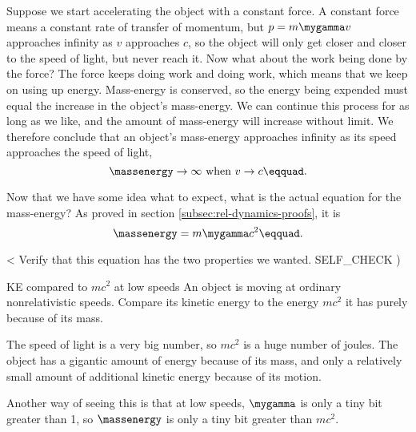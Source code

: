 Suppose we start accelerating the object with a constant force. A constant force means a constant
rate of transfer of momentum, but $p=m\mygamma v$ approaches infinity as $v$ approaches $c$, so the object
will only get closer and closer to the speed of light, but never reach it. Now what about the work being
done by the force? The force keeps doing work and doing work, which means that we keep on using up
energy. Mass-energy is conserved, so the energy being expended must equal the increase in the object's
mass-energy. We can continue this process for as long as we like, and the amount of mass-energy
will increase without limit. We therefore conclude that an object's mass-energy approaches infinity
as its speed approaches the speed of light,
\begin{equation*}
  \massenergy \rightarrow \infty\ \text{when}\ v \rightarrow c\eqquad.
\end{equation*}

Now that we have some idea what to expect, what is the actual equation for the mass-energy? 
As proved in section \ref{subsec:rel-dynamics-proofs}, it is
\begin{equation*}
  \massenergy =m\mygamma c^2\eqquad.
\end{equation*}

<%
Verify that this equation has the two properties we wanted.
  SELF_CHECK
  ) %

\begin{eg}{KE compared to $mc^2$ at low speeds}\label{eg:massenergy-low-speed}
\egquestion An object is moving at ordinary nonrelativistic speeds. Compare its
kinetic energy to the energy $mc^2$ it has purely because of its mass.

\eganswer The speed of light is a very big number, so $mc^2$ is a huge number of
joules. The object has a gigantic amount of energy because of its mass, and only
a relatively small amount of additional kinetic energy because of its motion.

Another way of seeing this is that at low speeds, $\mygamma$ is only a tiny bit
greater than 1, so $\massenergy$ is only a tiny bit greater than $mc^2$.
\end{eg}

